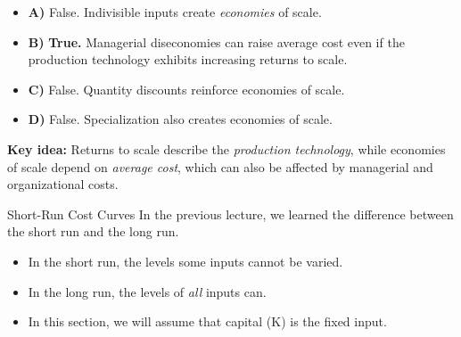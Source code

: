 \documentclass{beamer}
\begin{document}
\begin{frame}

\bigskip

\begin{itemize}
    \item \textbf{A)} False. Indivisible inputs create \emph{economies} of scale.
    
    \item \textbf{B)} \textbf{True.} Managerial diseconomies can raise average cost even if the production technology exhibits increasing returns to scale.
    
    \item \textbf{C)} False. Quantity discounts reinforce economies of scale.
    
    \item \textbf{D)} False. Specialization also creates economies of scale.
\end{itemize}

\bigskip

\textbf{Key idea:} Returns to scale describe the \emph{production technology}, while economies of scale depend on \emph{average cost}, which can also be affected by managerial and organizational costs.

\bigskip
\begin{center}
\end{center}

\end{frame}

\begin{frame}{Short-Run Cost Curves}
  In the previous lecture, we learned the difference between the short run and the long run.

  \begin{itemize}
    \item In the short run, the levels some inputs cannot be varied.
    
    \item In the long run, the levels of \textit{all} inputs can.
    
    \item In this section, we will assume that capital (K) is the fixed input.
  \end{itemize}
\end{frame}
\end{document}
